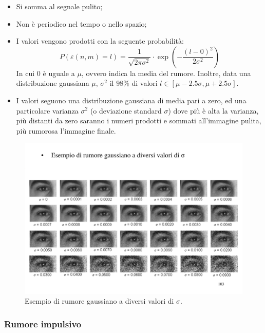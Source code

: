 \documentclass[a4paper]{article}
\begin{document}
	\begin{itemize}
		\item Si somma al segnale pulito;
		
		\item Non è periodico nel tempo o nello spazio;
		
		\item I valori vengono prodotti con la seguente probabilità:
		\begin{equation*}
			P\left(\varepsilon\left(n,m\right) = l\right) = \dfrac{1}{\sqrt{2\pi\sigma^{2}}} \cdot \exp\left(-\dfrac{\left(l - 0\right)^{2}}{2\sigma^{2}}\right)
		\end{equation*}
		In cui $0$ è uguale a $\mu$, ovvero indica la media del rumore. Inoltre, data una distribuzione gaussiana $\mu$, $\sigma^{2}$ il $98\%$ di valori $l \in \left[\mu - 2.5\sigma, \mu + 2.5\sigma\right]$.
		
		\item I valori seguono una distribuzione gaussiana di media pari a zero, ed una particolare varianza $\sigma^{2}$ (o deviazione standard $\sigma$) dove più è alta la varianza, più distanti da zero saranno i numeri prodotti e sommati all'immagine pulita, più rumorosa l'immagine finale.
	\end{itemize}

	\begin{figure}[!htp]
		\centering
		\includegraphics[width=\textwidth]{img/rumore_gaussiano_additivo_bianco.pdf}
		\caption{Esempio di rumore gaussiano a diversi valori di $\sigma$.}
	\end{figure}

	\newpage
	
	\subsubsection{Rumore impulsivo}
	
\end{document}
